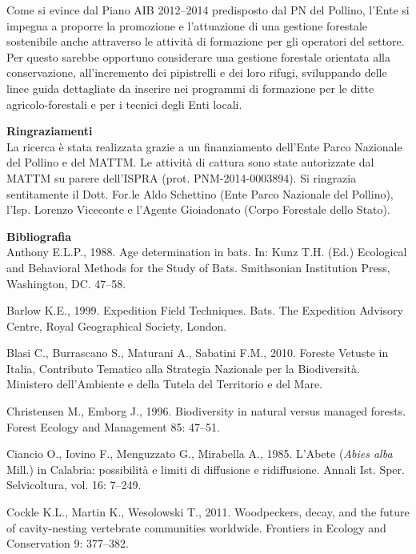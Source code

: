 \begin{multicols}{2}
Come si evince dal Piano AIB 2012--2014 predisposto dal PN del Pollino, l’Ente si impegna a proporre la promozione e l’attuazione di una gestione forestale sostenibile anche attraverso le attività di formazione per gli operatori del settore. Per questo sarebbe opportuno considerare una gestione forestale orientata alla conservazione, all’incremento dei pipistrelli e dei loro rifugi, sviluppando delle linee guida dettagliate da inserire nei programmi di formazione per le ditte agricolo-forestali e per i tecnici degli Enti locali. 

\vskip3mm

\begin{small}
\noindent\textbf{Ringraziamenti}\\
La ricerca è stata realizzata grazie a un finanziamento dell’Ente Parco Nazionale del Pollino e del MATTM. Le attività di cattura sono state autorizzate dal MATTM su parere dell’ISPRA (prot. PNM-2014-0003894). Si ringrazia sentitamente il Dott. For.le Aldo Schettino (Ente Parco Nazionale del Pollino), l’Isp. Lorenzo Viceconte e l’Agente Gioiadonato (Corpo Forestale dello Stato). 

\vskip3mm

\noindent\textbf{Bibliografia}\\

Anthony E.L.P., 1988. Age determination in bats. In: Kunz T.H. (Ed.) Ecological and Behavioral Methods for the Study of Bats. Smithsonian Institution Press, Washington, DC. 47--58.

Barlow K.E., 1999. Expedition Field Techniques. Bats. The Expedition Advisory Centre, Royal Geographical Society, London.

Blasi C., Burrascano S., Maturani A., Sabatini F.M., 2010. Foreste Vetuste in Italia, Contributo Tematico alla Strategia Nazionale per la Biodiversità. Ministero dell’Ambiente e della Tutela del Territorio e del Mare.

Christensen M., Emborg J., 1996. Biodiversity in natural versus managed forests. Forest Ecology and Management 85: 47--51.

Ciancio O., Iovino F., Menguzzato G., Mirabella A., 1985. L’Abete (\emph{Abies alba} Mill.) in Calabria: possibilità e limiti di diffusione e ridiffusione. Annali Ist. Sper. Selvicoltura, vol. 16: 7--249.

Cockle K.L., Martin K., Wesolowski T., 2011. Woodpeckers, decay, and the future of cavity-nesting vertebrate communities worldwide. Frontiers in Ecology and Conservation 9: 377--382.


\end{small}
\end{multicols}
